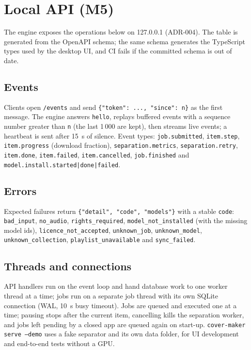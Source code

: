 \documentclass{covermaker}
\begin{document}
\chapter{Local API (M5)}
The engine exposes the operations below on 127.0.0.1 (ADR-004). The table is
generated from the OpenAPI schema; the same schema generates the TypeScript types
used by the desktop UI, and CI fails if the committed schema is out of date.



\section{Events}
Clients open \texttt{/events} and send \texttt{\{"token": ..., "since": n\}} as
the first message. The engine answers \texttt{hello}, replays buffered events
with a sequence number greater than \texttt{n} (the last 1\,000 are kept), then
streams live events; a heartbeat is sent after 15~s of silence. Event types:
\texttt{job.submitted}, \texttt{item.step}, \texttt{item.progress} (download
fraction), \texttt{separation.metrics}, \texttt{separation.retry},
\texttt{item.done}, \texttt{item.failed}, \texttt{item.cancelled},
\texttt{job.finished} and \texttt{model.install.started|done|failed}.

\section{Errors}
Expected failures return \texttt{\{"detail", "code", "models"\}} with a stable
\texttt{code}: \texttt{bad\_input}, \texttt{no\_audio}, \texttt{rights\_required},
\texttt{model\_not\_installed} (with the missing model ids),
\texttt{licence\_not\_accepted}, \texttt{unknown\_job}, \texttt{unknown\_model},
\texttt{unknown\_collection}, \texttt{playlist\_unavailable} and
\texttt{sync\_failed}.

\section{Threads and connections}
API handlers run on the event loop and hand database work to one worker thread
at a time; jobs run on a separate job thread with its own SQLite connection
(WAL, 10~s busy timeout). Jobs are queued and executed one at a time; pausing
stops after the current item, cancelling kills the separation worker, and jobs
left pending by a closed app are queued again on start-up. \texttt{cover-maker
serve --demo} uses a fake separator and its own data folder, for UI development
and end-to-end tests without a GPU.
\end{document}
